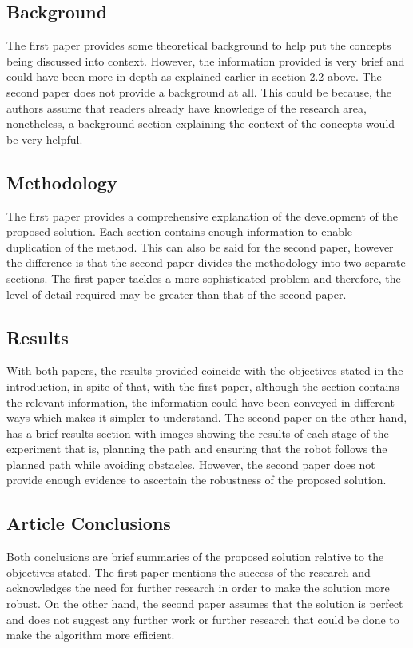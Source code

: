 \documentclass[a4paper, 12pt]{article}
\begin{document}
\subsection{Background} 
The first paper provides some theoretical background to help put the concepts being discussed into context. However, the information provided is very brief and could have been more in depth as explained earlier in section 2.2 above. The second paper does not provide a background at all. This could be because, the authors assume that readers already have knowledge of the research area, nonetheless, a background section explaining the context of the concepts would be very helpful.

\subsection{ Methodology}
The first paper provides a comprehensive explanation of the development of the proposed solution. Each section contains enough information to enable duplication of the method. This can also be said for the second paper, however the difference is that the second paper divides the methodology into two separate sections. The first paper tackles a more sophisticated problem and therefore, the level of detail required may be greater than that of the second paper.

\subsection{Results}
With both papers, the results provided coincide with the objectives stated in the introduction, in spite of that, with the first paper, although the section contains the relevant information, the information could have been conveyed in different ways which makes it simpler to understand. The second paper on the other hand, has a brief results section with images showing the results of each stage of the experiment that is, planning the path and ensuring that the robot follows the planned path while avoiding obstacles. However, the second paper does not provide enough evidence to ascertain the robustness of the proposed solution.

\subsection{Article Conclusions}
Both conclusions are brief summaries of the proposed solution relative to the objectives stated. The first paper mentions the success of the research and acknowledges the need for further research in order to make the solution more robust. On the other hand, the second paper assumes that the solution is perfect and does not suggest any further work or further research that could be done to make the algorithm more efficient.
\end{document}
